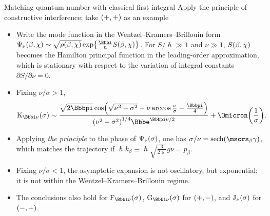 \documentclass[8pt]{beamer}
\begin{document}
\begin{frame}%
{Matching quantum number with classical first integral}%
{Apply the principle of constructive interference; take ${\left(+,+\right)}$ as an
example}

\begin{itemize}
\item Write the mode function in the Wentzel--Kramers--Brillouin form
$\rfun{\Psi_{\nu}}{\beta,\chi} \sim \sqrt{\rfun{\rho}{\beta,\chi}}\,
\cfun{\exp}{\frac{\ii}{\hslash}\rfun{S}{\beta,\chi}}$.
For $S/\hslash \gg 1$ and $\nu \gg 1$, ${S}\mathopen{}\left(\beta,\chi\right)\mathclose{}$ becomes
the Hamilton principal function in the leading-order approximation, which is
\alert{stationary} with respect to the variation of integral constants
$\partial S/\partial \nu = 0$.
\end{itemize}


\begin{itemize}
\item Fixing $\nu/\sigma>1$,
\begin{align}
\rfun{\mathrm{K}_{\ii \nu}}{\sigma} \sim
\frac{\sqrt{2\pp}\,
\rfun{\cos}{\sqrt{\nu^2-\sigma^2}-\nu\arccos\frac{\nu}{\sigma}-\frac{\pp}{4}}
}{
\rbr{\nu^2-\sigma^2}^{1/4}\ee^{\pp\nu/2}}
+\rfun{\Omicron}{\frac{1}{\sigma}}.
\end{align}

\item Applying \emph{the principle} to the phase of ${\Psi_\nu}\mathopen{}\left(\sigma\right)\mathclose{}$, 
one has
$\sigma/\nu = \rfun{\sech}{\mscrs_\beta\gamma}$, which matches the trajectory
if $\hslash k_\beta \equiv \hslash \sqrt{\frac{3}{2\varkappa}}g\nu
= p_\beta$.


\item Fixing $\nu/\sigma<1$, the asymptotic expansion is not oscillatory,
but exponential; it is not within the Wentzel--Kramers--Brillouin regime.
\end{itemize}

\begin{itemize}
\item The conclusions also hold for $\rfun{\mathrm{F}_{\ii\nu}}{\sigma}$, 
$\rfun{\mathrm{G}_{\ii\nu}}{\sigma}$ for ${\left(+,-\right)}$, and
${\mathrm{J}_{\nu}}\mathopen{}\left(\sigma\right)\mathclose{}$ for ${\left(-,+\right)}$.
\end{itemize}
\end{frame}
\end{document}
